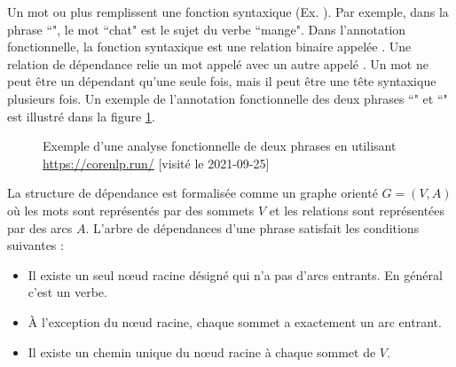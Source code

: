 \documentclass{KodeBook}
\begin{document}
Un mot ou plus remplissent une fonction syntaxique (Ex. ).
Par exemple, dans la phrase ``", le mot ``chat" est le sujet du verbe ``mange". 
Dans l'annotation fonctionnelle, la fonction syntaxique est une relation binaire appelée .
Une relation de dépendance relie un mot appelé  avec un autre appelé . 
Un mot ne peut être un dépendant qu'une seule fois, mais il peut être une tête syntaxique plusieurs fois. 
Un exemple de l'annotation fonctionnelle des deux phrases ``" et ``" est illustré dans la figure \ref{fig:parse-fct-exp}.
%
\begin{figure}[ht]
	\centering
	\caption[Exemple d'une analyse fonctionnelle de deux phrases]{Exemple d'une analyse fonctionnelle de deux phrases en utilisant \url{https://corenlp.run/} [visité le 2021-09-25]\label{fig:parse-fct-exp}}
\end{figure}

La structure de dépendance est formalisée comme un graphe orienté $G=(V, A)$ où les mots sont représentés par des sommets $V$ et les relations sont représentées par des arcs $A$. 
L'arbre de dépendances d'une phrase satisfait les conditions suivantes : 
\begin{itemize}
	\item Il existe un seul nœud racine désigné qui n'a pas d'arcs entrants. En général c'est un verbe.
	\item À l'exception du nœud racine, chaque sommet a exactement un arc entrant.
	\item Il existe un chemin unique du nœud racine à chaque sommet de $V$.
\end{itemize}
\end{document}
